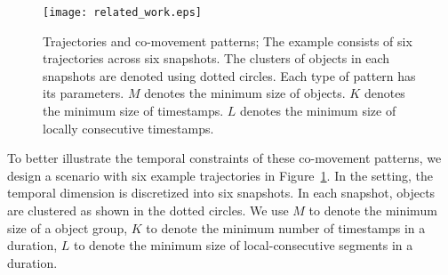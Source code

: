 % 
\begin{figure}[h]
\centering
\texttt{[image: related\_work.eps]}
\caption{Trajectories and co-movement patterns; The example consists of six trajectories across six snapshots. The
clusters of objects in each snapshots are denoted using dotted circles. Each type of pattern has its parameters. 
$M$ denotes the minimum size of objects.
$K$ denotes the minimum size of timestamps.
$L$ denotes the minimum size of locally consecutive timestamps.}
\label{fig:related_work}
\end{figure}


To better illustrate the temporal constraints of these 
co-movement patterns, we design a scenario with six example trajectories in Figure~\ref{fig:related_work}.
In the setting, the temporal dimension  is discretized into six snapshots. 
In each snapshot, objects are clustered as shown in the dotted circles. We use $M$ to denote
the minimum size of a object group, $K$ to denote the minimum number 
of timestamps in a duration, $L$ to denote the minimum size of local-consecutive segments in a duration.

